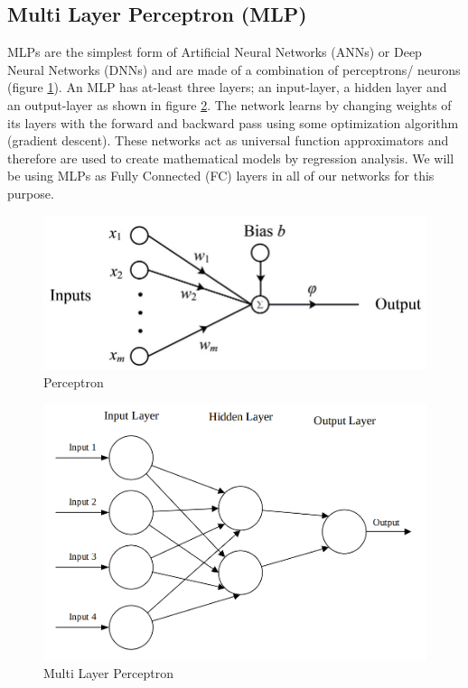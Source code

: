 \subsection{Multi Layer Perceptron (MLP)}
MLPs are the simplest form of Artificial Neural Networks (ANNs) or Deep Neural Networks (DNNs) and are made of a combination of perceptrons/ neurons (figure \ref{fig:perceptron}). An MLP has at-least three layers; an input-layer, a hidden layer and an output-layer as shown in figure \ref{fig:mlp}. The network learns by changing weights of its layers with the forward and backward pass using some optimization algorithm (gradient descent). These networks act as universal function approximators \citep{cybenko1989approximation} and therefore are used to create mathematical models by regression analysis. We will be using MLPs as Fully Connected (FC) layers in all of our networks for this purpose.

\begin{figure}[H]
    \centering
    \includegraphics[scale=0.5]{images/fig_chapter2/nns/perceptron.png}
    \caption{Perceptron}
    \label{fig:perceptron}
\end{figure}

\begin{figure}[H]
    \centering
    \includegraphics[scale=0.3]{images/fig_chapter2/nns/mlp.png}
    \caption{Multi Layer Perceptron}
    \label{fig:mlp}
\end{figure}

